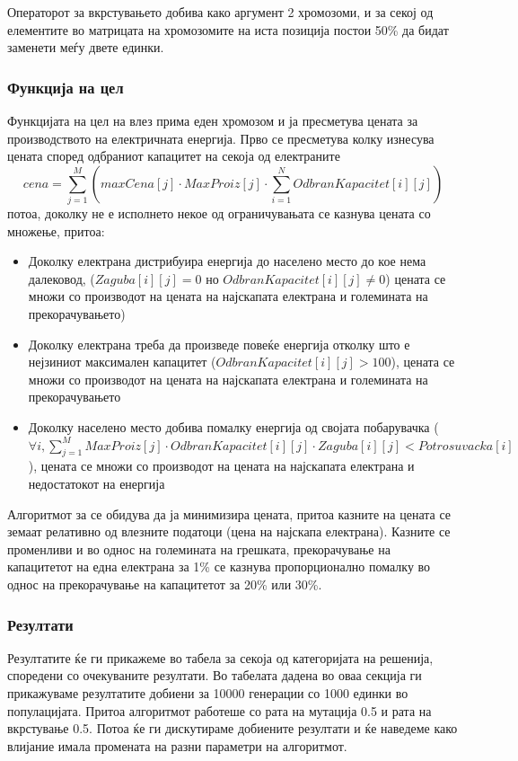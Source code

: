 \documentclass{article}
\begin{document}
Операторот за вкрстувањето добива како аргумент 2 хромозоми, и за секој од елементите во матрицата на хромозомите на иста позиција постои 50\% да бидат заменети меѓу двете единки. 
 
\subsubsection{Функција на цел}

Функцијата на цел на влез прима еден хромозом и ја пресметува цената за производството на електричната енергија. Прво се пресметува колку изнесува цената според одбраниот капацитет на секоја од електраните 
\[ cena = \sum_{j=1}^{M} (maxCena[j] \cdot MaxProiz[j] \cdot  \sum_{i=1}^{N} OdbranKapacitet[i][j] )\]
потоа, доколку не е исполнето некое од ограничувањата се казнува цената со множење, притоа:
\begin{itemize}
\item Доколку електрана дистрибуира енергија до населено место до кое нема далековод, ($Zaguba[i][j] = 0$ но $OdbranKapacitet[i][j] \neq 0$) цената се множи со производот на цената на најскапата електрана и големината на прекорачувањето)  
\item Доколку електрана треба да произведе повеќе енергија отколку што е нејзиниот максимален капацитет ($OdbranKapacitet[i][j] > 100$), цената се множи со производот на цената на најскапата електрана и големината на прекорачувањето 
\item Доколку населено место добива помалку енергија од својата побарувачка ($ \forall i, \sum_{j=1}^{M} MaxProiz[j] \cdot OdbranKapacitet[i][j] \cdot Zaguba[i][j] < Potrosuvacka[i]$), цената се множи со производот на цената на најскапата електрана и недостатокот на енергија 
\end{itemize}

Алгоритмот за се обидува да ја минимизира цената, притоа казните на цената се земаат релативно од влезните податоци (цена на најскапа електрана). Казните се променливи и во однос на големината на грешката, прекорачување на капацитетот на една електрана за 1\% се казнува пропорционално помалку во однос на прекорачување на капацитетот за 20\% или 30\%.

\subsubsection{Резултати}
 
Резултатите ќе ги прикажеме во табела за секоја од категоријата на решенија, споредени со очекуваните резултати. Во табелата дадена во оваа секција ги прикажуваме резултатите добиени за 10000 генерации со 1000 единки во популацијата. Притоа алгоритмот работеше со рата на мутација 0.5 и рата на вкрстување 0.5. Потоа ќе ги дискутираме добиените резултати и ќе наведеме како влијание имала промената на разни параметри на алгоритмот. 
\end{document}
